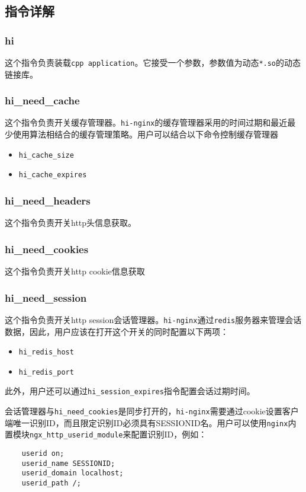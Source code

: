 \subsection{指令详解}
\subsubsection{hi}
这个指令负责装载\texttt{cpp application}。它接受一个参数，参数值为动态\texttt{*.so}的动态链接库。
\subsubsection{hi_need_cache}
这个指令负责开关缓存管理器。\texttt{hi-nginx}的缓存管理器采用的时间过期和最近最少使用算法相结合的缓存管理策略。用户可以结合以下命令控制缓存管理器
\begin{itemize}
\item \texttt{hi_cache_size}
\item \texttt{hi_cache_expires}
\end{itemize}
\subsubsection{hi_need_headers}
这个指令负责开关http头信息获取。
\subsubsection{hi_need_cookies}
这个指令负责开关http cookie信息获取
\subsubsection{hi_need_session}
这个指令负责开关http session会话管理器。\texttt{hi-nginx}通过\texttt{redis}服务器来管理会话数据，因此，用户应该在打开这个开关的同时配置以下两项：
\begin{itemize}
\item \texttt{hi_redis_host}
\item \texttt{hi_redis_port}
\end{itemize}
此外，用户还可以通过\texttt{hi_session_expires}指令配置会话过期时间。

会话管理器与\texttt{hi_need_cookies}是同步打开的，\texttt{hi-nginx}需要通过cookie设置客户端唯一识别ID，而且限定识别ID必须具有SESSIONID名。用户可以使用\texttt{nginx}内置模块\texttt{ngx_http_userid_module}来配置识别ID，例如：
\begin{lstlisting}
	userid on;
	userid_name SESSIONID;
	userid_domain localhost;
	userid_path /;
\end{lstlisting}
